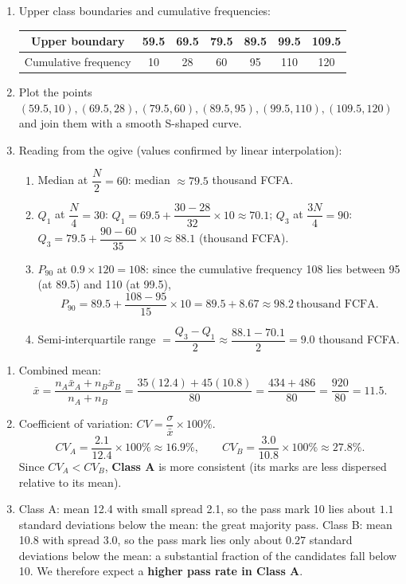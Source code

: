 \documentclass[11pt]{article}
\begin{document}
\begin{corrige}
\begin{enumerate}
\item Upper class boundaries and cumulative frequencies:
\begin{center}
\begin{tabular}{|c|c|c|c|c|c|c|}\hline
\rowcolor{popblueL} Upper boundary & 59.5 & 69.5 & 79.5 & 89.5 & 99.5 & 109.5 \\ \hline
Cumulative frequency & 10 & 28 & 60 & 95 & 110 & 120 \\ \hline
\end{tabular}
\end{center}
\item Plot the points $(59.5, 10), (69.5, 28), (79.5, 60), (89.5, 95), (99.5, 110), (109.5, 120)$ and join them with a smooth S-shaped curve.
\item Reading from the ogive (values confirmed by linear interpolation):
\begin{enumerate}
\item Median at $\dfrac{N}{2} = 60$: median $\approx 79.5$ thousand FCFA.
\item $Q_1$ at $\dfrac{N}{4} = 30$: $Q_1 = 69.5 + \dfrac{30-28}{32}\times 10 \approx 70.1$; $Q_3$ at $\dfrac{3N}{4} = 90$: $Q_3 = 79.5 + \dfrac{90-60}{35}\times 10 \approx 88.1$ (thousand FCFA).
\item $P_{90}$ at $0.9 \times 120 = 108$: since the cumulative frequency 108 lies between 95 (at 89.5) and 110 (at 99.5),
\[
P_{90} = 89.5 + \frac{108 - 95}{15}\times 10 = 89.5 + 8.67 \approx 98.2\ \text{thousand FCFA}.
\]
\item Semi-interquartile range $= \dfrac{Q_3 - Q_1}{2} \approx \dfrac{88.1 - 70.1}{2} = 9.0$ thousand FCFA.
\end{enumerate}
\end{enumerate}
\end{corrige}

\begin{corrige}
\begin{enumerate}
\item Combined mean:
\[
\bar{x} = \frac{n_A \bar{x}_A + n_B \bar{x}_B}{n_A + n_B} = \frac{35(12.4) + 45(10.8)}{80} = \frac{434 + 486}{80} = \frac{920}{80} = 11.5.
\]
\item Coefficient of variation: $CV = \dfrac{\sigma}{\bar{x}}\times 100\%$.
\[
CV_A = \frac{2.1}{12.4}\times 100\% \approx 16.9\%, \qquad CV_B = \frac{3.0}{10.8}\times 100\% \approx 27.8\%.
\]
Since $CV_A < CV_B$, \textbf{Class A} is more consistent (its marks are less dispersed relative to its mean).
\item Class A: mean 12.4 with small spread 2.1, so the pass mark 10 lies about $1.1$ standard deviations below the mean: the great majority pass. Class B: mean 10.8 with spread 3.0, so the pass mark lies only about $0.27$ standard deviations below the mean: a substantial fraction of the candidates fall below 10. We therefore expect a \textbf{higher pass rate in Class A}.
\end{enumerate}
\end{corrige}
\end{document}
